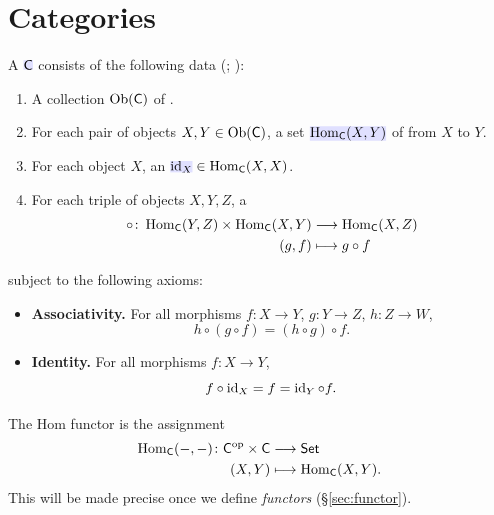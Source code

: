 \documentclass[../preamble]{subfiles}
\begin{document}
\section{Categories}
\label{sec:category}

A  $\newmath{\Category{C}}$ consists of the following data
(; ):
\begin{enumerate}
  \item A collection $\operatorname{Ob}(\mathsf{C})$ of .
  \item For each pair of objects $X, Y \in \operatorname{Ob}(\mathsf{C})$,
    a set $\newmath{\Hom_{\Category{C}}(X, Y)}$ of 
    from $X$ to $Y$.
  \item For each object $X$,
    an 
    $\newmath{\id_X} \in \Hom_{\Category{C}}(X, X)$.
  \item For each triple of objects $X, Y, Z$,
    a 
    \begin{equation}
      \begin{aligned}
        \circ \colon \Hom_{\Category{C}}(Y, Z) \times \Hom_{\Category{C}}(X, Y)
          &\lto \Hom_{\Category{C}}(X, Z) \\
        (g, f) &\lmapsto g \circ f
      \end{aligned}
      \label{eq:cat-comp}
    \end{equation}
\end{enumerate}

subject to the following axioms:
\begin{itemize}
  \item \textbf{Associativity.}
    For all morphisms $f \colon X \to Y$, $g \colon Y \to Z$, $h \colon Z \to W$,
    \begin{equation}
      \label{eq:cat-assoc}
      h \circ (g \circ f) = (h \circ g) \circ f.
    \end{equation}

  \item \textbf{Identity.}
    For all morphisms $f \colon X \to Y$,
    \begin{equation}
      \label{eq:cat-id}
      f \circ \operatorname{id}_X = f = \operatorname{id}_Y \circ f.
    \end{equation}
\end{itemize}

\begin{remark}
The Hom functor is the assignment
\begin{equation}
  \begin{aligned}
    \Hom_{\Category{C}}(-,-) \colon
      \Category{C}^{\mathrm{op}} \times \Category{C}
      &\lto \Set \\
    (X, Y) &\lmapsto \Hom_{\Category{C}}(X, Y).
  \end{aligned}
  \label{eq:hom-functor}
\end{equation}
This will be made precise once we define \emph{functors} (\S\ref{sec:functor}).
\end{remark}
\end{document}
